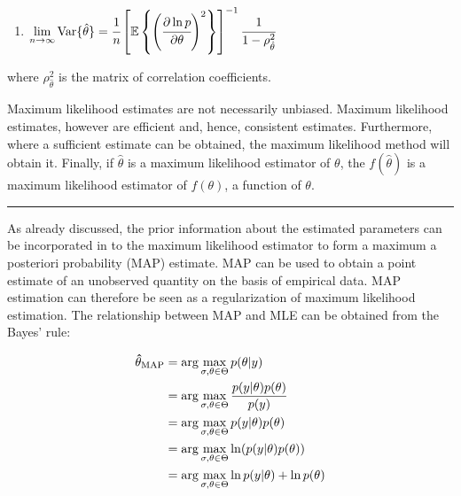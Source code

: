 \documentclass[a4paper,fleqn]{cas-dc}
\begin{document}
\begin{enumerate}[resume,label=(\arabic*)]
	\item {\footnotesize $\lim\limits_{n \rightarrow \infty} \text{Var}\{\hat{\theta}\} = \cfrac{1}{n} \left[ \mathbb{E} \left\{ \left( \cfrac{\partial \ln p}{\partial \theta} \right)^2 \right\} \right]^{-1} \cfrac{1}{1-\rho^2_{\hat{\theta}}} $ } \label{Assumption_MLE}
\end{enumerate}

where $\rho^2_{\hat{\theta}}$ is the matrix of correlation coefficients.

Maximum likelihood estimates are not necessarily unbiased. Maximum likelihood estimates, however are efficient and, hence, consistent estimates. Furthermore, where a sufficient estimate can be obtained, the maximum likelihood method will obtain it. Finally, if $\hat{\theta}$ is a maximum likelihood estimator of $\theta$, the $f\left( \hat{\theta} \right)$ is a maximum likelihood estimator of $f\left( \theta \right)$, a function of $\theta$.

\hrule


As already discussed, the prior information about the estimated parameters can be incorporated in to the maximum likelihood estimator to form a maximum a posteriori probability (MAP) estimate. MAP can be used to obtain a point estimate of an unobserved quantity on the basis of empirical data. MAP estimation can therefore be seen as a regularization of maximum likelihood estimation. The relationship between MAP and MLE can be obtained from the Bayes' rule:

{\footnotesize
\begin{equation} 
	\begin{split} \label{EQ: MAP_probability}
		{\bf \hat{\theta}_{\text{MAP}}} &= \arg\max_{\sigma, \theta \in \Theta} p(\theta | y) \\
		&= \arg\max_{\sigma, \theta \in \Theta} \frac{p(y | \theta) p(\theta)}{p(y)} \\
		&= \arg\max_{\sigma, \theta \in \Theta} p(y | \theta) p(\theta) \\
		&= \arg\max_{\sigma, \theta \in \Theta} \ln(p(y | \theta) p(\theta)) \\
		&= \arg\max_{\sigma, \theta \in \Theta} \ln p(y | \theta) + \ln p(\theta)
	\end{split}
\end{equation} }
\end{document}
